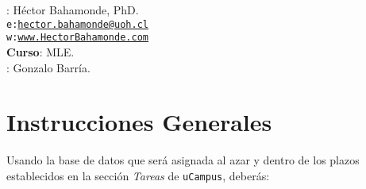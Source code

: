 \documentclass[10pt]{article}
\begin{document}


\thispagestyle{fancy} %





\hspace{-5mm}{\bf Profesor}: H\'ector Bahamonde, PhD.\\
\texttt{e:}\href{mailto:hector.bahamonde@uoh.cl}{\texttt{hector.bahamonde@uoh.cl}}\\
\texttt{w:}\href{http://www.hectorbahamonde.com}{\texttt{www.HectorBahamonde.com}}\\
{\bf Curso}: MLE.\\
\hspace{-5mm}{\bf TA}: Gonzalo Barr\'ia.


\vspace{-0.8cm}
\section*{Instrucciones Generales}

Usando la base de datos que ser\'a asignada al azar y dentro de los plazos establecidos en la secci\'on \emph{Tareas} de \texttt{uCampus}, deber\'as:
\end{document}
